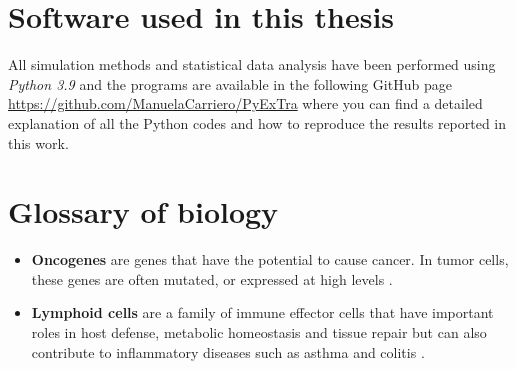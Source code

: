 \documentclass[12pt,a4paper]{report}
\begin{document}
\begin{appendices}
  \chapter{Software used in this thesis}
  All simulation methods and statistical data analysis have been performed using \emph{Python 3.9} and the programs are available in the following GitHub page \url{https://github.com/ManuelaCarriero/PyExTra} where you can find a detailed explanation of all the Python codes and how to reproduce the results reported in this work.
  \chapter{Glossary of biology}
  \begin{itemize}
   \item \textbf{Oncogenes} are genes that have the potential to cause cancer. In tumor cells, these genes are often mutated, or expressed at high levels \cite{oncogenes}.
   
    \item \textbf{Lymphoid cells} are a family of immune effector cells that have important roles in host defense, metabolic homeostasis and tissue repair but can also contribute to inflammatory diseases such as asthma and colitis \cite{lymphoidcellsnih}.
     

\end{itemize}
\end{appendices}
\end{document}
